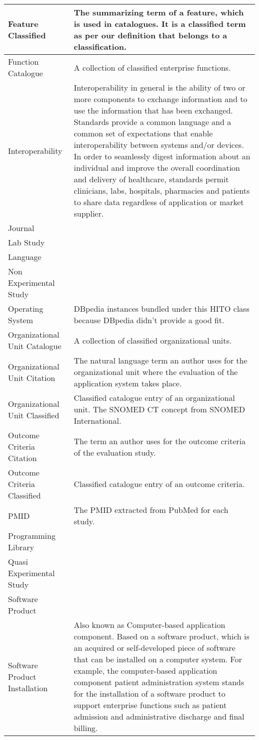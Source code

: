 \begin{longtable}{ | p{4 cm} | p{7 cm} | }
\hline
Feature Classified & The summarizing term of a feature, which is used in catalogues. It is a classified term as per our definition that belongs to a classification. \\
\hline
Function Catalogue & A collection of classified enterprise functions. \\
\hline
Interoperability & Interoperability in general is the ability of two or more components to exchange information and to use the information that has been exchanged. Standards provide a common language and a common set of expectations that enable interoperability between systems and/or devices. In order to seamlessly digest information about an individual and improve the overall coordination and delivery of healthcare, standards permit clinicians, labs, hospitals, pharmacies and patients to share data regardless of application or market supplier. \\
\hline
Journal &  \\
\hline
Lab Study &  \\
\hline
Language &  \\
\hline
Non Experimental Study &  \\
\hline
Operating System & DBpedia instances bundled under this HITO class because DBpedia didn't provide a good fit. \\
\hline
Organizational Unit Catalogue & A collection of classified organizational units. \\
\hline
Organizational Unit Citation & The natural language term an author uses for the organizational unit where the evaluation of the application system takes place. \\
\hline
Organizational Unit Classified & Classified catalogue entry of an organizational unit. The SNOMED CT concept from SNOMED International. \\
\hline
Outcome Criteria Citation & The term an author uses for the outcome criteria of the evaluation study. \\
\hline
Outcome Criteria Classified & Classified catalogue entry of an outcome criteria. \\
\hline
PMID & The PMID extracted from PubMed for each study. \\
\hline
Programming Library &  \\
\hline
Quasi Experimental Study &  \\
\hline
Software Product &  \\
\hline
Software Product Installation & Also known as Computer-based application component. Based on a software product, which is an acquired or self-developed piece of software that can be installed on a computer system. For example, the computer-based application component patient administration system stands for the installation of a software product to support enterprise functions such as patient admission and administrative discharge and final billing. \\

\end{longtable}
